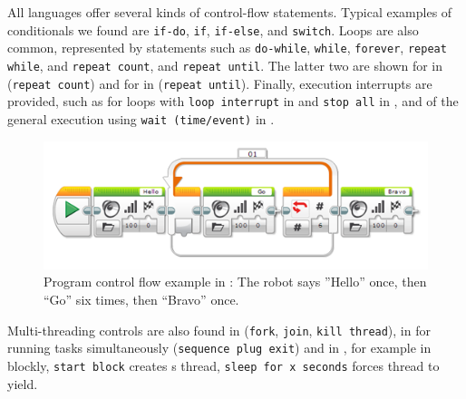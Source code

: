  All languages offer several kinds of control-flow statements. Typical examples of conditionals we found are \texttt{if-do}, \texttt{if}, \texttt{if-else}, and \texttt{switch}. Loops are also common, represented by statements such as \texttt{do-while}, \texttt{while}, \texttt{forever}, \texttt{repeat while}, and \texttt{repeat count}, and \texttt{repeat until}. The latter two are shown for \lego in  (\texttt{repeat count}) and for \robotc in  (\texttt{repeat until}). Finally, execution interrupts are provided, such as for loops with \texttt{loop interrupt} in \lego and \texttt{stop all} in \tello, and of the general execution using \texttt{wait (time/event)} in \makeblock.

\begin{figure}[t]
     \centering
    \includegraphics[width=1\columnwidth]{legoLoop.png}
      \caption{Program control flow example in \lego: The robot says ''Hello'' once, then ``Go'' six times, then ``Bravo'' once.}
      \label{fig:legoloopcount}
			\vspace{-.4cm}
   \end{figure}


Multi-threading controls are also found in \trik (\texttt{fork}, \texttt{join}, \texttt{kill thread}), in  \lego for running tasks simultaneously (\texttt{sequence plug exit}) and in \robotmesh, for example in blockly,  \texttt{start block} creates s thread, \texttt{sleep for x seconds} forces thread to yield. %

